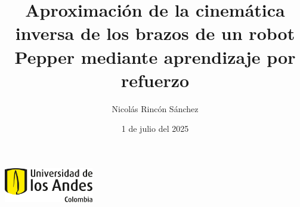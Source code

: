 \documentclass[spanish,10pt]{beamer}
\title[Proyecto de Grado]{Aproximación de la cinemática inversa de los brazos de un robot Pepper mediante aprendizaje por refuerzo}
\author{Nicolás Rincón Sánchez}
\institute{Universidad de los Andes}
\date{1 de julio del 2025}
\begin{document}
	
	\begin{frame}[plain]
		\begin{block}{}
			\centering
			\includegraphics[height=1.5cm]{images/logo-uniandes.png}\\[1em]
			{\LARGE \textbf{\inserttitle}}\\[1em]
			{\large \insertshorttitle}\\[2em]
			{\large \textbf{\insertauthor}}\\[0.5em]
			{\normalsize \insertdate}
		\end{block}
	\end{frame}
	
\end{document}
